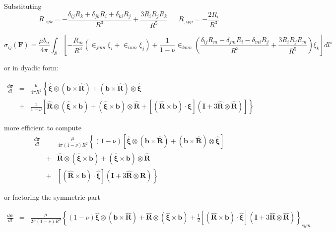 Substituting 
\begin{equation}
R_{,ijk}=-\frac{\delta_{ij}R_k+\delta_{jk}R_i+\delta_{ki}R_j}{R^3}+\frac{3R_iR_jR_k}{R^5} \ \ \ \ \ \ \    R_{,ipp}=-\frac{2R_i}{R^3}
\end{equation}

\begin{equation}
\sigma_{ij}(\bm F)=\frac{\mu b_n}{4\pi}\int_\mathcal{S} \left[-\frac{R_m}{R^3}\left(\in_{jmn}\xi_i+\in_{imn}\xi_j\right)+\frac{1}{1-\nu}\in_{kmn}\left(\frac{\delta_{ij}R_m-\delta_{jm}R_i-\delta_{mi}R_j}{R^3}+\frac{3R_iR_jR_m}{R^5}\right)\xi_k\right]dl^s
\end{equation}




or in dyadic form:

\begin{eqnarray}
\frac{d\bm \sigma}{dl}&=&\frac{\mu}{4\pi R^2}\left\{\hat{\bm\xi}\otimes(\bm b\times \hat{\bm R})+(\bm b\times \hat{\bm R})\otimes\hat{\bm\xi}\right.\nonumber\\
&+&\left.\frac{1}{1-\nu}\left[\hat{\bm R}\otimes(\hat{\bm\xi}\times\bm b)+(\hat{\bm\xi}\times\bm b)\otimes\hat{\bm R}
+ \left[(\hat{\bm R}\times\bm b)\cdot\hat{\bm\xi}\right]\left(\bm I + 3\hat{\bm R}\otimes\hat{\bm R} \right)\right]\right\}
\end{eqnarray}

more efficient to compute
\begin{eqnarray}
\frac{d\bm \sigma}{dl}&=&\frac{\mu}{4\pi (1-\nu)R^2}\left\{(1-\nu)\left[\hat{\bm\xi}\otimes(\bm b\times \hat{\bm R})+(\bm b\times \hat{\bm R})\otimes\hat{\bm\xi}\right]\right.\nonumber\\
&+&\left.\hat{\bm R}\otimes(\hat{\bm\xi}\times\bm b)+(\hat{\bm\xi}\times\bm b)\otimes\hat{\bm R}\right.\nonumber\\
&+&\left. \left[(\hat{\bm R}\times\bm b)\cdot\hat{\bm\xi}\right]\left(\bm I + 3\hat{\bm R}\otimes\hat{\bm R} \right)\right\}
\end{eqnarray}



or factoring the symmetric part

\begin{eqnarray}
\frac{d\bm \sigma}{dl}&=&\frac{\mu}{2\pi (1-\nu)R^2}\left\{(1-\nu)\hat{\bm\xi}\otimes(\bm b\times \hat{\bm R})
+\hat{\bm R}\otimes(\hat{\bm\xi}\times\bm b)
+\frac{1}{2}\left[(\hat{\bm R}\times\bm b)\cdot\hat{\bm\xi}\right]\left(\bm I + 3\hat{\bm R}\otimes\hat{\bm R} \right)\right\}_{sym}
\end{eqnarray}

